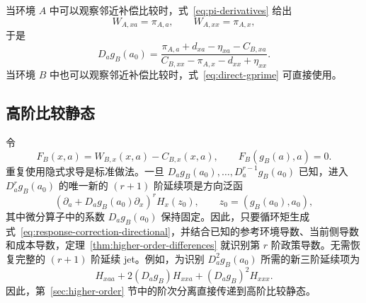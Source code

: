 当环境 $A$ 中可以观察邻近补偿比较时，式~\eqref{eq:pi-derivatives} 给出
\begin{equation}
W_{A,xa}=\pi_{A,a},
\qquad
W_{A,xx}=\pi_{A,x},
\label{eq:anchor-pi-derivs-v19}
\end{equation}
于是
\begin{equation}
\boxed{
D_ag_B(a_0)
=
\frac{
\pi_{A,a}+d_{xa}-\eta_{xa}-C_{B,xa}
}{
C_{B,xx}-\pi_{A,x}-d_{xx}+\eta_{xx}
}.}
\label{eq:anchor-to-target-v19}
\end{equation}
当环境 $B$ 中也可以观察邻近补偿比较时，式~\eqref{eq:direct-gprime} 可直接使用。

\subsection{高阶比较静态}
\label{sec:policy-hierarchy}

令
\[
F_B(x,a)=W_{B,x}(x,a)-C_{B,x}(x,a),
\qquad
F_B(g_B(a),a)=0.
\]
重复使用隐式求导是标准做法。一旦 $D_ag_B(a_0),\ldots,D_a^{r-1}g_B(a_0)$ 已知，进入 $D_a^rg_B(a_0)$ 的唯一新的 $(r+1)$ 阶延续项是方向泛函
\begin{equation}
\boxed{
\left(\partial_a+D_ag_B(a_0)\partial_x\right)^r H_x(z_0),
\qquad z_0=(g_B(a_0),a_0),}
\label{eq:response-correction-directional}
\end{equation}
其中微分算子中的系数 $D_ag_B(a_0)$ 保持固定。因此，只要循环矩生成式~\eqref{eq:response-correction-directional}，并结合已知的参考环境导数、当前侧导数和成本导数，定理~\ref{thm:higher-order-differences} 就识别第 $r$ 阶政策导数。无需恢复完整的 $(r+1)$ 阶延续 jet。例如，为识别 $D_a^2g_B(a_0)$ 所需的新三阶延续项为
\[
H_{xaa}+2(D_ag_B)H_{xxa}+(D_ag_B)^2H_{xxx}.
\]
因此，第~\ref{sec:higher-order} 节中的阶次分离直接传递到高阶比较静态。
